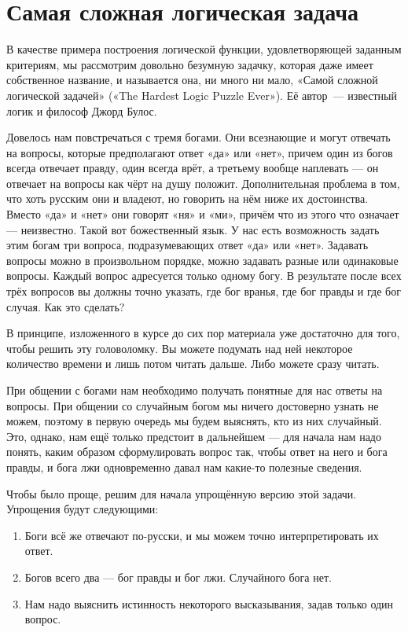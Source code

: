 \section{Самая сложная логическая задача}

В качестве примера построения логической функции, удовлетворяющей заданным критериям, мы рассмотрим довольно безумную задачку, которая даже имеет собственное название, и называется она, ни много ни мало, «Самой сложной логической задачей» («The Hardest Logic Puzzle Ever»). Её автор~--- известный логик и философ Джорд Булос.

\begin{problem}
Довелось нам повстречаться с тремя богами. Они всезнающие и могут отвечать на вопросы, которые предполагают ответ «да» или «нет», причем один из богов всегда отвечает правду, один всегда врёт, а третьему вообще наплевать — он отвечает на вопросы как чёрт на душу положит. Дополнительная проблема в том, что хоть русским они и владеют, но говорить на нём ниже их достоинства. Вместо «да» и «нет» они говорят «ня» и «ми», причём что из этого что означает — неизвестно. Такой вот божественный язык. У нас есть возможность задать этим богам три вопроса, подразумевающих ответ «да» или «нет». Задавать вопросы можно в произвольном порядке, можно задавать разные или одинаковые вопросы. Каждый вопрос адресуется только одному богу. В результате после всех трёх вопросов вы должны точно указать, где бог вранья, где бог правды и где бог случая. Как это сделать?
\end{problem}

В принципе, изложенного в курсе до сих пор материала уже достаточно для того, чтобы решить эту головоломку. Вы можете подумать над ней некоторое количество времени и лишь потом читать дальше. Либо можете сразу читать.

При общении с богами нам необходимо получать понятные для нас ответы на вопросы. При общении со случайным богом мы ничего достоверно узнать не можем, поэтому в первую очередь мы будем выяснять, кто из них случайный. Это, однако, нам ещё только предстоит в дальнейшем — для начала нам надо понять, каким образом сформулировать вопрос так, чтобы ответ на него и бога правды, и бога лжи одновременно давал нам какие-то полезные сведения.

Чтобы было проще, решим для начала упрощённую версию этой задачи. Упрощения будут следующими:

\begin{enumerate}
\item Боги всё же отвечают по-русски, и мы можем точно интерпретировать их ответ.
\item Богов всего два — бог правды и бог лжи. Случайного бога нет.
\item Нам надо выяснить истинность некоторого высказывания, задав только один вопрос.
\end{enumerate}

